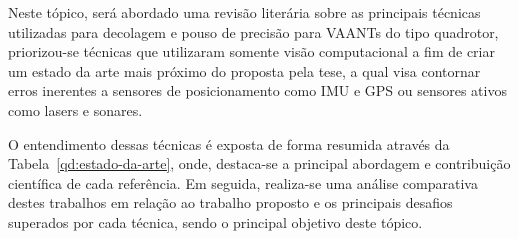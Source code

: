 


	
	Neste tópico, será abordado uma revisão literária sobre as principais técnicas utilizadas para decolagem e pouso de precisão para VAANTs do tipo quadrotor, priorizou-se técnicas que utilizaram somente visão computacional a fim de criar um estado da arte mais próximo do proposta pela tese, a qual visa contornar erros inerentes a sensores de posicionamento como IMU e GPS ou sensores ativos como lasers e sonares. 
	
	O entendimento dessas técnicas é exposta de forma resumida através da Tabela~\ref{qd:estado-da-arte}, onde, destaca-se a principal abordagem e contribuição científica de cada referência. Em seguida, realiza-se uma análise comparativa destes trabalhos em relação ao trabalho proposto e os principais desafios superados por cada técnica, sendo o principal objetivo deste tópico. 
	
